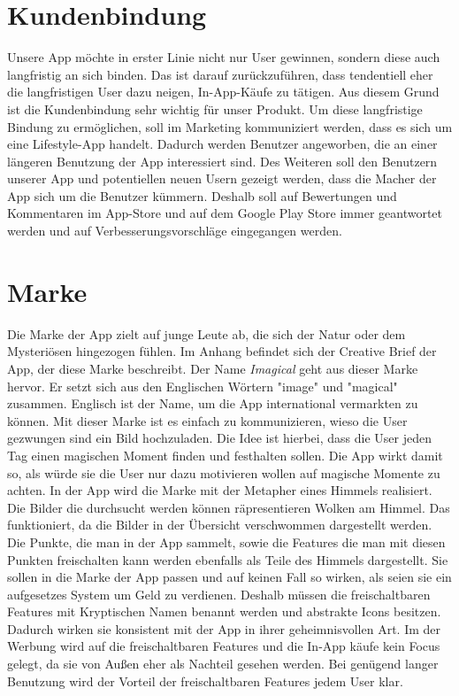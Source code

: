\section{Kundenbindung}

Unsere App möchte in erster Linie nicht nur User gewinnen, sondern diese auch langfristig an sich binden. Das ist darauf zurückzuführen, dass tendentiell eher die langfristigen User dazu neigen, In-App-Käufe zu tätigen. Aus diesem Grund ist die Kundenbindung sehr wichtig für unser Produkt. Um diese langfristige Bindung zu ermöglichen, soll im Marketing kommuniziert werden, dass es sich um eine Lifestyle-App handelt. Dadurch werden Benutzer angeworben, die an einer längeren Benutzung der App interessiert sind.
Des Weiteren soll den Benutzern unserer App und potentiellen neuen Usern gezeigt werden, dass die Macher der App sich um die Benutzer kümmern. Deshalb soll auf Bewertungen und Kommentaren im App-Store und auf dem Google Play Store immer geantwortet werden und auf Verbesserungsvorschläge eingegangen werden.

\section{Marke}

Die Marke der App zielt auf junge Leute ab, die sich der Natur oder dem Mysteriösen hingezogen fühlen. Im Anhang befindet sich der Creative Brief der App, der diese Marke beschreibt.
Der Name \textit{Imagical} geht aus dieser Marke hervor. Er setzt sich aus den Englischen Wörtern "image" und "magical" zusammen. Englisch ist der Name, um die App international vermarkten zu können.
Mit dieser Marke ist es einfach zu kommunizieren, wieso die User gezwungen sind ein Bild hochzuladen. Die Idee ist hierbei, dass die User jeden Tag einen magischen Moment finden und festhalten sollen. Die App wirkt damit so, als würde sie die User nur dazu motivieren wollen auf magische Momente zu achten.
In der App wird die Marke mit der Metapher eines Himmels realisiert. Die Bilder die durchsucht werden können räpresentieren Wolken am Himmel. Das funktioniert, da die Bilder in der Übersicht verschwommen dargestellt werden. Die Punkte, die man in der App sammelt, sowie die Features die man mit diesen Punkten freischalten kann werden ebenfalls als Teile des Himmels dargestellt. Sie sollen in die Marke der App passen und auf keinen Fall so wirken, als seien sie ein aufgesetzes System um Geld zu verdienen. Deshalb müssen die freischaltbaren Features mit Kryptischen Namen benannt werden und abstrakte Icons besitzen. Dadurch wirken sie konsistent mit der App in ihrer geheimnisvollen Art.
Im der Werbung wird auf die freischaltbaren Features und die In-App käufe kein Focus gelegt, da sie von Außen eher als Nachteil gesehen werden. Bei genügend langer Benutzung wird der Vorteil der freischaltbaren Features jedem User klar.

